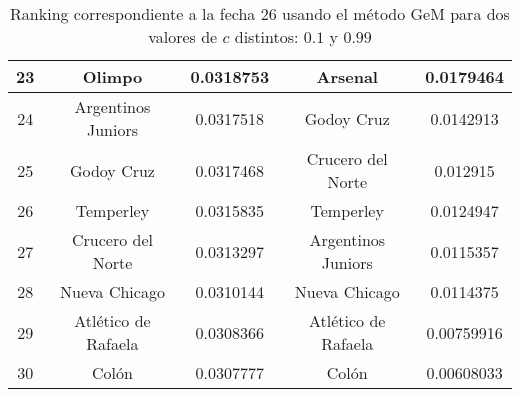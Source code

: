 \begin{table}[H]
\begin{flushright}
\begin{tabular}{| c | c | c || c | c |}
		23 & Olimpo & 0.0318753 & Arsenal & 0.0179464 \\ \hline
		24 & Argentinos Juniors & 0.0317518 & Godoy Cruz & 0.0142913 \\ \hline
		25 & Godoy Cruz & 0.0317468 & Crucero del Norte & 0.012915 \\ \hline
		26 & Temperley & 0.0315835 & Temperley & 0.0124947 \\ \hline
		27 & Crucero del Norte & 0.0313297 & Argentinos Juniors & 0.0115357 \\ \hline
		28 & Nueva Chicago & 0.0310144 & Nueva Chicago & 0.0114375 \\ \hline
		29 & Atlético de Rafaela & 0.0308366 & Atlético de Rafaela & 0.00759916 \\ \hline
		30 & Colón & 0.0307777 & Colón & 0.00608033 \\ \hline
	\end{tabular}
	\end{flushright}
	\caption{\footnotesize Ranking correspondiente a la fecha 26 usando el método GeM para dos valores de $c$ distintos: $0.1$ y $0.99$}
	\label{tab:variosc}
\end{table}
